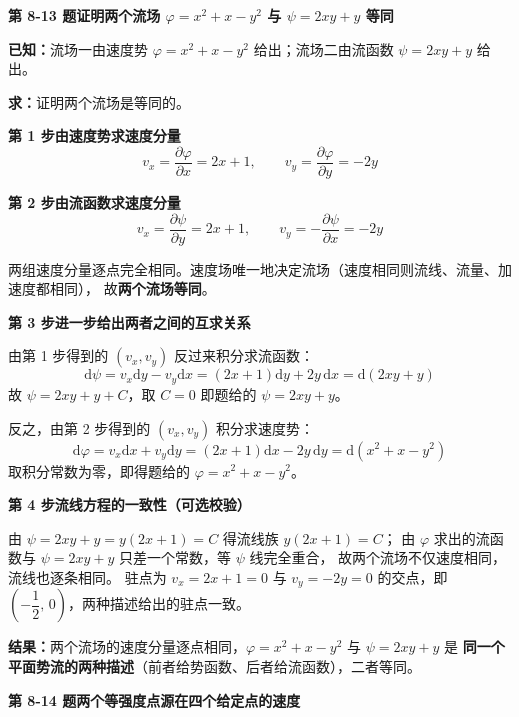 \noindent\textbf{第 8-13 题\quad 证明两个流场 $\varphi=x^2+x-y^2$ 与 $\psi=2xy+y$ 等同}

\begin{jie}
\textbf{已知：}流场一由速度势 $\varphi=x^2+x-y^2$ 给出；流场二由流函数 $\psi=2xy+y$ 给出。

\textbf{求：}证明两个流场是等同的。

\textbf{第 1 步\quad 由速度势求速度分量}
\[ v_x=\frac{\partial\varphi}{\partial x}=2x+1,\qquad v_y=\frac{\partial\varphi}{\partial y}=-2y \]

\textbf{第 2 步\quad 由流函数求速度分量}
\[ v_x=\frac{\partial\psi}{\partial y}=2x+1,\qquad v_y=-\frac{\partial\psi}{\partial x}=-2y \]

两组速度分量逐点完全相同。速度场唯一地决定流场（速度相同则流线、流量、加速度都相同），
故\textbf{两个流场等同}。

\textbf{第 3 步\quad 进一步给出两者之间的互求关系}

由第 1 步得到的 $(v_x,v_y)$ 反过来积分求流函数：
\[ \mathrm{d}\psi=v_x\mathrm{d}y-v_y\mathrm{d}x=(2x+1)\mathrm{d}y+2y\,\mathrm{d}x
 =\mathrm{d}(2xy+y) \]
故 $\psi=2xy+y+C$，取 $C=0$ 即题给的 $\psi=2xy+y$。

反之，由第 2 步得到的 $(v_x,v_y)$ 积分求速度势：
\[ \mathrm{d}\varphi=v_x\mathrm{d}x+v_y\mathrm{d}y=(2x+1)\mathrm{d}x-2y\,\mathrm{d}y
 =\mathrm{d}\left(x^2+x-y^2\right) \]
取积分常数为零，即得题给的 $\varphi=x^2+x-y^2$。

\textbf{第 4 步\quad 流线方程的一致性（可选校验）}

由 $\psi=2xy+y=y(2x+1)=C$ 得流线族 $y(2x+1)=C$；
由 $\varphi$ 求出的流函数与 $\psi=2xy+y$ 只差一个常数，等 $\psi$ 线完全重合，
故两个流场不仅速度相同，流线也逐条相同。
驻点为 $v_x=2x+1=0$ 与 $v_y=-2y=0$ 的交点，即 $\left(-\dfrac{1}{2},\,0\right)$，两种描述给出的驻点一致。

\textbf{结果：}两个流场的速度分量逐点相同，$\varphi=x^2+x-y^2$ 与 $\psi=2xy+y$ 是
\textbf{同一个平面势流的两种描述}（前者给势函数、后者给流函数），二者等同。
\end{jie}

\noindent\textbf{第 8-14 题\quad 两个等强度点源在四个给定点的速度}

